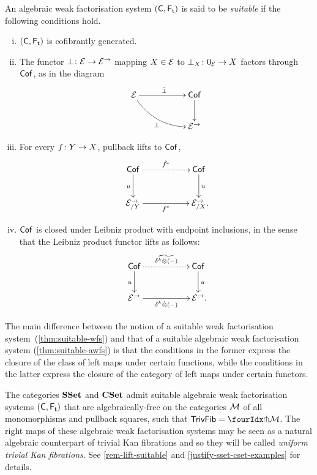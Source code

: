 \documentclass[reqno,10pt,a4paper,oneside,draft]{amsart}
\begin{document}
{{\begin{definition} \label{thm:suitable-awfs}
An algebraic weak factorisation system $(\CC, \TF)$ is said to be \emph{suitable} if the following conditions hold.
\begin{enumerate}[(i)]
\item $(\CC, \TF)$ is cofibrantly generated.
\item The functor $\bot \co \cal{E} \to \cal{E}^\to$ mapping $X \in \cal{E}$ to $\bot_X \co 0_{\cal{E}} \to X$ factors through
$\Cof$, as in the diagram
\[
\xymatrix@C+3em{
\catE \ar[r]^{\tilde{\bot}} \ar@/_1pc/[dr]_{\bot} & \Cof \ar[d] \\
  & \catE^\to}
\]
\item For every $f \co Y \to X$, pullback lifts to $\Cof$, 
\[
\xymatrix@C+3em{
  \Cof
  \ar@{.>}[r]^{\tilde{f^*}}
  \ar[d]_{u}
&
  \Cof
  \ar[d]^{u}
\\
  \catE^\to_{/Y}
  \ar[r]_{f^*}
&
  \catE^\to_{/X}
\rlap{.}}
\]
\item $\Cof$ is closed under Leibniz product with endpoint inclusions, in the sense that the Leibniz product functor
lifts as follows:
\[
\xymatrix@C+3em{
  \Cof 
  \ar@{.>}[r]^{\widetilde{\kcyl \hatotimes (-)}}
  \ar[d]_{u}
&
 \Cof
  \ar[d]^{u}
\\
  \catE^\to
  \ar[r]_{\kcyl \hatotimes (-)}
&
  \catE^\to
\rlap{.}}
\]
\end{enumerate}
\end{definition}



The main difference between the notion of a suitable weak factorisation system~(\cref{thm:suitable-wfs}) and that of a suitable algebraic
weak factorisation system (\cref{thm:suitable-awfs}) is that the conditions in the former express the closure of the class of left maps under certain functions, while the conditions in the latter express the closure of the category of left maps under certain functors. 

\begin{example} \label{unif-triv-fib-sset}
The categories $\SSet$ and $\CSet$ admit suitable algebraic weak factorisation systems $(\CC, \TF)$ that are algebraically-free on the
categories $\cal{M}$ of all monomorphisms and pullback squares, \ie such that $\TrivFib = \liftr{\cal{M}}$. The right maps of these algebraic weak factorisation systems may
be seen as a natural algebraic counterpart of trivial Kan fibrations and so they will be called \emph{uniform trivial Kan fibrations}. See \cref{rem-lift-suitable} and 
\cref{justify-sset-cset-examples} for details. 
\end{example} 


}}
\end{document}
